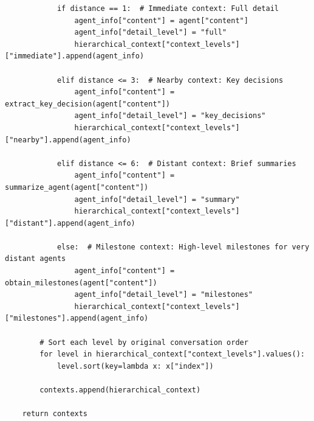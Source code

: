 \documentclass{article}
\begin{document}
\begin{lstlisting}
            if distance == 1:  # Immediate context: Full detail
                agent_info["content"] = agent["content"]
                agent_info["detail_level"] = "full"
                hierarchical_context["context_levels"]["immediate"].append(agent_info)

            elif distance <= 3:  # Nearby context: Key decisions
                agent_info["content"] = extract_key_decision(agent["content"])
                agent_info["detail_level"] = "key_decisions"
                hierarchical_context["context_levels"]["nearby"].append(agent_info)

            elif distance <= 6:  # Distant context: Brief summaries
                agent_info["content"] = summarize_agent(agent["content"])
                agent_info["detail_level"] = "summary"
                hierarchical_context["context_levels"]["distant"].append(agent_info)

            else:  # Milestone context: High-level milestones for very distant agents
                agent_info["content"] = obtain_milestones(agent["content"])
                agent_info["detail_level"] = "milestones"
                hierarchical_context["context_levels"]["milestones"].append(agent_info)

        # Sort each level by original conversation order
        for level in hierarchical_context["context_levels"].values():
            level.sort(key=lambda x: x["index"])

        contexts.append(hierarchical_context)

    return contexts
\end{lstlisting}
\end{document}
